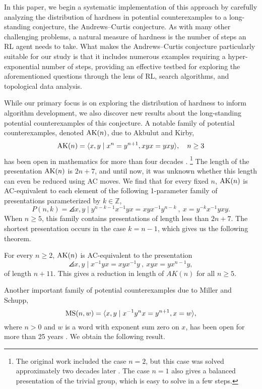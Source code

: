 In this paper, we begin a systematic implementation of this approach by carefully analyzing the distribution of hardness in potential counterexamples to a long-standing conjecture, the Andrews--Curtis conjecture. As with many other challenging problems, a natural measure of hardness is the number of steps an RL agent needs to take. What makes the Andrews--Curtis conjecture particularly suitable for our study is that it includes numerous examples requiring a hyper-exponential number of steps, providing an effective testbed for exploring the aforementioned questions through the lens of RL, search algorithms, and topological data analysis.


While our primary focus is on exploring the distribution of hardness to inform algorithm development, we also discover new results about the long-standing potential counterexamples of this conjecture. A notable family of potential counterexamples, denoted $\text{AK}(n)$, due to Akbulut and Kirby, 
\[
\text{AK}(n) = \langle x, y \mid x^n = y^{n+1}, xyx = yxy\rangle, \quad n \geq 3
\]
has been open in mathematics for more than four decades \cite{Akbulut--Kirby}.
\footnote{The original work included the case $n=2$, but this case was solved approximately two decades later \cite{genetic}. The case $n=1$ also gives a balanced presentation of the trivial group, which is easy to solve in a few steps.}
The length of the presentation $\text{AK}(n)$ is $2n + 7$, and 
until now, it was unknown whether this length can even be reduced using AC moves. We find that for every fixed $n$, $\text{AK}(n)$ is AC-equivalent to each element of the following 1-parameter family of presentations parameterized by $k \in \mathbb{Z}$,
\[P(n, k) = \angles{x, y \mid  y^{n-k-1}  x^{-1} y x = x y x^{-1} y^{n-k} \ , \ x = y^{-k} x^{-1} y x y }.
\]
When $n \geq 5$, this family contains presentations of length less than $2n + 7$. The shortest presentation occurs in the case $k=n-1$, which gives us the following theorem.

\begin{theorem}\label{t:n+11}
	For every $n\geq 2$, $\text{AK}(n)$ is AC-equivalent to the presentation
	\[
	\angles{ x,y \mid x^{-1} y x = x y x^{-1} y \ ,\  xyx=yx^{n-1}y },
	\]
	of length $n+11$. This gives a reduction in length of $AK(n)$ for all $n \geq 5$.
\end{theorem}

Another important family of potential counterexamples due to Miller and Schupp,
\[
\text{MS}(n, w) = \langle x, y \mid x^{-1} y^n x = y^{n+1}, x = w\rangle,
\]
where $n > 0$ and $w$ is a word with exponent sum zero on $x$, has been open for more than 25 years \cite{Miller--Schupp}. We obtain the following result.

